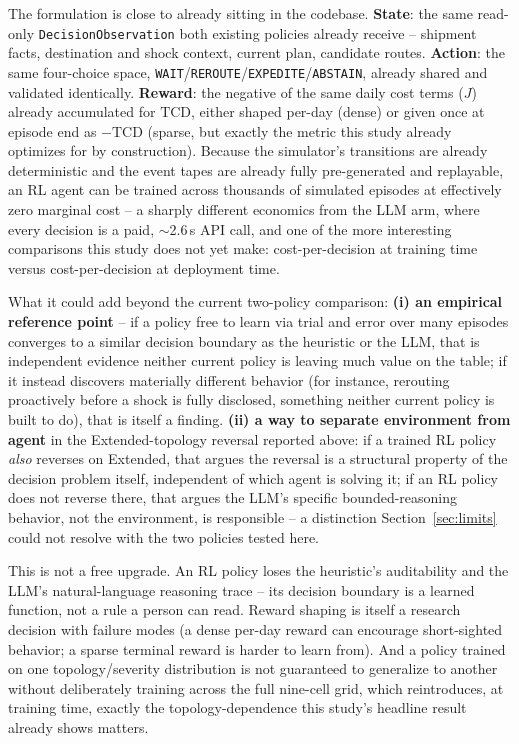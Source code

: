 \documentclass[10pt,twocolumn]{article}
\newcommand{\tcd}{\ensuremath{\mathrm{TCD}}}
\begin{document}
The formulation is close to already sitting in the codebase. \textbf{State}: the same read-only \texttt{DecisionObservation} both existing policies already receive -- shipment facts, destination and shock context, current plan, candidate routes. \textbf{Action}: the same four-choice space, \texttt{WAIT}/\texttt{REROUTE}/\texttt{EXPEDITE}/\texttt{ABSTAIN}, already shared and validated identically. \textbf{Reward}: the negative of the same daily cost terms ($J$) already accumulated for $\tcd$, either shaped per-day (dense) or given once at episode end as $-\tcd$ (sparse, but exactly the metric this study already optimizes for by construction). Because the simulator's transitions are already deterministic and the event tapes are already fully pre-generated and replayable, an RL agent can be trained across thousands of simulated episodes at effectively zero marginal cost -- a sharply different economics from the LLM arm, where every decision is a paid, $\sim$2.6\,s API call, and one of the more interesting comparisons this study does not yet make: cost-per-decision at training time versus cost-per-decision at deployment time.

What it could add beyond the current two-policy comparison: \textbf{(i) an empirical reference point} -- if a policy free to learn via trial and error over many episodes converges to a similar decision boundary as the heuristic or the LLM, that is independent evidence neither current policy is leaving much value on the table; if it instead discovers materially different behavior (for instance, rerouting proactively before a shock is fully disclosed, something neither current policy is built to do), that is itself a finding. \textbf{(ii) a way to separate environment from agent} in the Extended-topology reversal reported above: if a trained RL policy \emph{also} reverses on Extended, that argues the reversal is a structural property of the decision problem itself, independent of which agent is solving it; if an RL policy does not reverse there, that argues the LLM's specific bounded-reasoning behavior, not the environment, is responsible -- a distinction Section~\ref{sec:limits} could not resolve with the two policies tested here.

This is not a free upgrade. An RL policy loses the heuristic's auditability and the LLM's natural-language reasoning trace -- its decision boundary is a learned function, not a rule a person can read. Reward shaping is itself a research decision with failure modes (a dense per-day reward can encourage short-sighted behavior; a sparse terminal reward is harder to learn from). And a policy trained on one topology/severity distribution is not guaranteed to generalize to another without deliberately training across the full nine-cell grid, which reintroduces, at training time, exactly the topology-dependence this study's headline result already shows matters.
\end{document}
